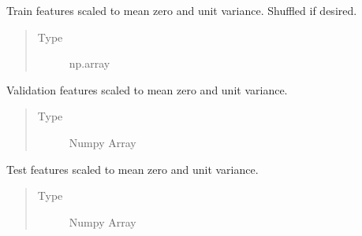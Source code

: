 \documentclass[letterpaper,10pt,english]{sphinxmanual}
\begin{document}
\begin{fulllineitems}
\begin{fulllineitems}
\begin{quote}
\begin{description}
\end{description}\end{quote}

\end{fulllineitems}


\begin{fulllineitems}
\label{\detokenize{api/ucf.TrainingDataSets:ucf.TrainingDataSets.scaled_train_features}}
Train features scaled to mean zero and unit variance. Shuffled
if desired.
\begin{quote}\begin{description}
\item[{Type}] \leavevmode
np.array

\end{description}\end{quote}

\end{fulllineitems}


\begin{fulllineitems}
\label{\detokenize{api/ucf.TrainingDataSets:ucf.TrainingDataSets.scaled_validation_features}}
Validation features scaled to mean zero and unit variance.
\begin{quote}\begin{description}
\item[{Type}] \leavevmode
Numpy Array

\end{description}\end{quote}

\end{fulllineitems}


\begin{fulllineitems}
\label{\detokenize{api/ucf.TrainingDataSets:ucf.TrainingDataSets.scaled_test_features}}
Test features scaled to mean zero and unit variance.
\begin{quote}\begin{description}
\item[{Type}] \leavevmode
Numpy Array


\end{description}
\end{quote}
\end{fulllineitems}
\end{fulllineitems}
\end{document}
